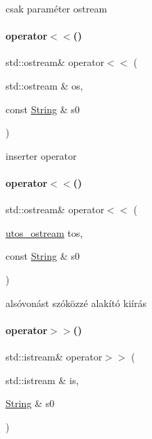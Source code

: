csak paraméter ostream 

\mbox{\label{schtring_8hpp_aef14876e55f43fb4ffa7b91664467ecb}} 
\paragraph{\texorpdfstring{operator$<$$<$()}{operator<<()}\hspace{0.1cm}{\footnotesize\ttfamily [7/8]}}
{\footnotesize\ttfamily std\+::ostream\& operator$<$$<$ (\begin{DoxyParamCaption}\item[{std\+::ostream \&}]{os,  }\item[{const \mbox{\hyperlink{class_string}{String}} \&}]{s0 }\end{DoxyParamCaption})}



inserter operator 

\mbox{\label{schtring_8hpp_a06c0f45780d45c035c1eabecbb34198d}} 
\paragraph{\texorpdfstring{operator$<$$<$()}{operator<<()}\hspace{0.1cm}{\footnotesize\ttfamily [8/8]}}
{\footnotesize\ttfamily std\+::ostream\& operator$<$$<$ (\begin{DoxyParamCaption}\item[{\mbox{\hyperlink{structutos__ostream}{utos\+\_\+ostream}}}]{tos,  }\item[{const \mbox{\hyperlink{class_string}{String}} \&}]{s0 }\end{DoxyParamCaption})}



alsóvonást szóközzé alakító kiírás 

\mbox{\label{schtring_8hpp_aea8ed420ad5e70828bc42b0fb9b49366}} 
\paragraph{\texorpdfstring{operator$>$$>$()}{operator>>()}}
{\footnotesize\ttfamily std\+::istream\& operator$>$$>$ (\begin{DoxyParamCaption}\item[{std\+::istream \&}]{is,  }\item[{\mbox{\hyperlink{class_string}{String}} \&}]{s0 }\end{DoxyParamCaption})}



